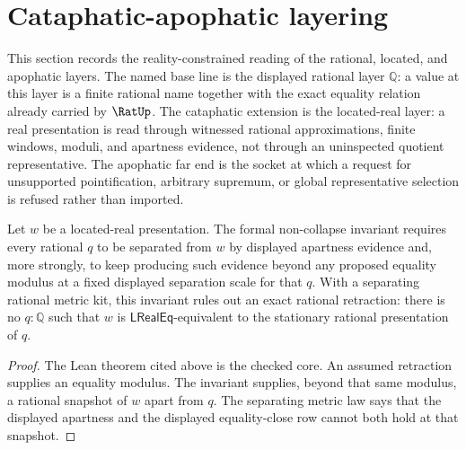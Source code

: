 \section{Cataphatic-apophatic layering}
\label{sec:cataphatic-apophatic-layering}

This section records the reality-constrained reading of the rational,
located, and apophatic layers. The named base line is the displayed
rational layer $\mathbb Q$: a value at this layer is a finite rational
name together with the exact equality relation already carried by
$\RatUp$. The cataphatic extension is the located-real layer: a real
presentation is read through witnessed rational approximations,
finite windows, moduli, and apartness evidence, not through an
uninspected quotient representative. The apophatic far end is the socket
at which a request for unsupported pointification, arbitrary supremum, or
global representative selection is refused rather than imported.


\begin{principle}
\label{prin:cataphatic-apophatic-noncollapse-invariant}
Let $w$ be a located-real presentation. The formal non-collapse invariant
requires every rational $q$ to be separated from $w$ by displayed
apartness evidence and, more strongly, to keep producing such evidence
beyond any proposed equality modulus at a fixed displayed separation
scale for that $q$. With a separating rational metric kit, this
invariant rules out an exact rational retraction:
there is no $q:\mathbb Q$ such that $w$ is
$\mathsf{LRealEq}$-equivalent to the stationary rational presentation of
$q$.
\end{principle}

\begin{proof}
The Lean theorem cited above is the checked core. An assumed retraction
supplies an equality modulus. The invariant supplies, beyond that same
modulus, a rational snapshot of $w$ apart from $q$. The separating metric
law says that the displayed apartness and the displayed equality-close
row cannot both hold at that snapshot.
\end{proof}

